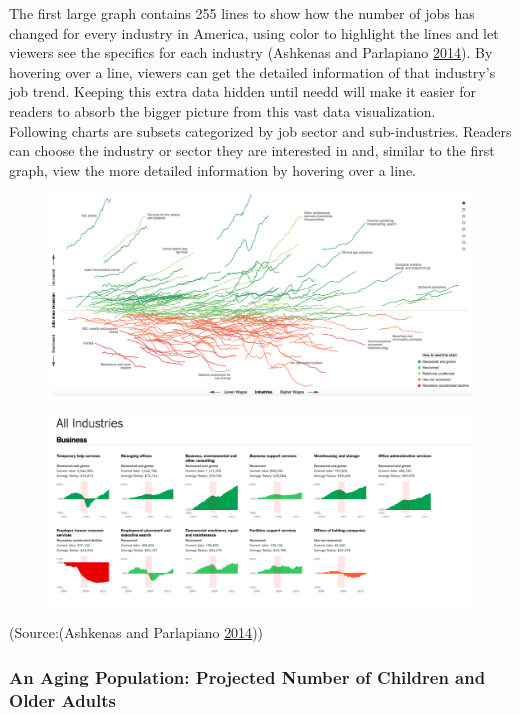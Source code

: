 \documentclass[]{book}
\begin{document}
The first large graph contains 255 lines to show how the number of jobs
has changed for every industry in America, using color to highlight the
lines and let viewers see the specifics for each industry (Ashkenas and
Parlapiano \protect\hyperlink{ref-recession_economy}{2014}). By hovering
over a line, viewers can get the detailed information of that industry's
job trend. Keeping this extra data hidden until needd will make it
easier for readers to absorb the bigger picture from this vast data
visualization.\\
Following charts are subsets categorized by job sector and
sub-industries. Readers can choose the industry or sector they are
interested in and, similar to the first graph, view the more detailed
information by hovering over a line.

\begin{figure}
\centering
\includegraphics{images/recession_jobs.png}
\caption{}
\end{figure}

\begin{figure}
\centering
\includegraphics{images/recession_jobs2.png}
\caption{}
\end{figure}

(Source:(Ashkenas and Parlapiano
\protect\hyperlink{ref-recession_economy}{2014}))

\subsubsection{An Aging Population: Projected Number of Children and
Older
Adults}\label{an-aging-population-projected-number-of-children-and-older-adults}
\end{document}
